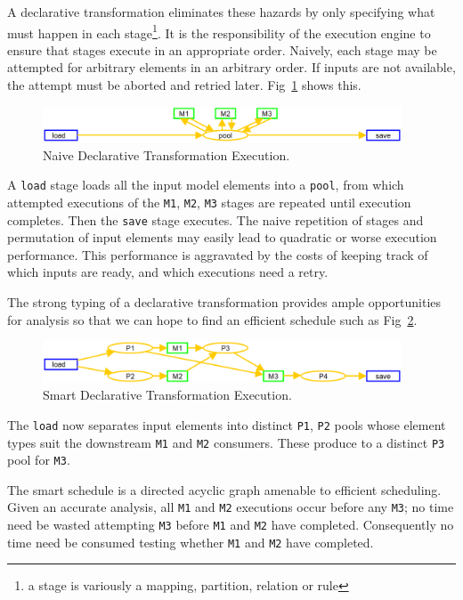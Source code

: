 \documentclass{llncs}
\begin{document}
A declarative transformation eliminates these hazards by only specifying what must happen in each stage\footnote{a stage is variously a mapping, partition, relation or rule}. It is the responsibility of the execution engine to ensure that stages execute in an appropriate order. Naively, each stage may be attempted for arbitrary elements in an arbitrary order. If inputs are not available, the attempt must be aborted and retried later. Fig~\ref{fig:NaiveExecution} shows this.

\begin{figure}[h]
	\centering
	\includegraphics[width=0.95\textwidth]{NaiveExecution.png}
	\caption{Naive Declarative Transformation Execution.}
	\label{fig:NaiveExecution}
\end{figure}

A \verb$load$ stage loads all the input model elements into a \verb$pool$, from which attempted executions of the \verb$M1$, \verb$M2$, \verb$M3$ stages are repeated until execution completes. Then the \verb$save$ stage executes. The naive repetition of stages and permutation of input elements may easily lead to quadratic or worse execution performance. This performance is aggravated by the costs of keeping track of which inputs are ready, and which executions need a retry.

The strong typing of a declarative transformation provides ample opportunities for analysis so that we can hope to find an efficient schedule such as Fig~\ref{fig:SmartExecution}.

\begin{figure}[h]
	\centering
	\includegraphics[width=0.95\textwidth]{SmartExecution.png}
	\caption{Smart Declarative Transformation Execution.}
	\label{fig:SmartExecution}
\end{figure}

The \verb$load$ now separates input elements into distinct \verb$P1$, \verb$P2$ pools whose element types suit the downstream \verb$M1$ and \verb$M2$ consumers. These produce to a distinct \verb$P3$ pool for \verb$M3$.

The smart schedule is a directed acyclic graph amenable to efficient scheduling. Given an accurate analysis, all \verb$M1$ and \verb$M2$ executions occur before any \verb$M3$; no time need be wasted attempting \verb$M3$ before \verb$M1$ and \verb$M2$ have completed. Consequently no time need be consumed testing whether \verb$M1$ and \verb$M2$ have completed.
\end{document}
